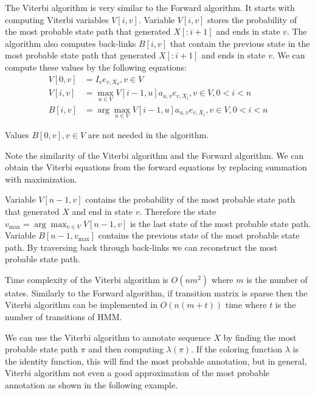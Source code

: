 The Viterbi algorithm is very similar to the  Forward algorithm. It starts with computing
Viterbi variables $V[i,v]$. Variable $V[i,v]$ stores the probability of the most probable 
state path that generated $X[:i+1]$ and ends in state $v$. The algorithm
also computes back-links $B[i,v]$ that contain the previous state in the most
probable state path that generated $X[:i+1]$ and ends in state $v$. We can
compute these values by the following equations:
\begin{align}
V[0,v] &= I_{v}e_{v,X_0}, v\in V\\
V[i,v] &= \max_{u\in V} V[i-1,u]a_{u,v}e_{v,X_i}, v\in V,0<i<n\\
B[i,v] &= \arg\max_{u\in V} V[i-1,u]a_{u,v}e_{v,X_i}, v\in V,0<i<n
\end{align}
\begin{note}
Values $B[0,v],v\in V$ are not needed in the algorithm.

Note the similarity of the Viterbi algorithm and the Forward algorithm.
We can obtain the Viterbi equations from the forward equations by replacing
summation with
maximization.
\end{note}


Variable $V[n-1,v]$ contains the probability of the most probable state path
that generated $X$ and end in state $v$. Therefore the state $v_{\max} =
\arg\max_{v\in V}V[n-1,v]$ is the last state of the most probable state path.
Variable $B[n-1,v_{\max}]$ contains the previous state of the most probable
state path. By traversing back through back-links  we can reconstruct the most
probable state path.

Time complexity of the Viterbi algorithm is $O(nm^2)$ where $m$ is the number of
states. Similarly to the Forward algorithm, if transition matrix is sparse then 
the Viterbi algorithm can be implemented in $O(n(m+t))$ time where $t$ is the
number of transitions of HMM.


We can use the Viterbi algorithm to annotate sequence $X$ by finding the most
probable state path $\pi$ and then computing $\lambda(\pi)$. If the  coloring
function $\lambda$ is the identity function, this will find the most probable
annotation, but in general, Viterbi algorithm not even a good approximation of
the most probable annotation as shown in the following example.

